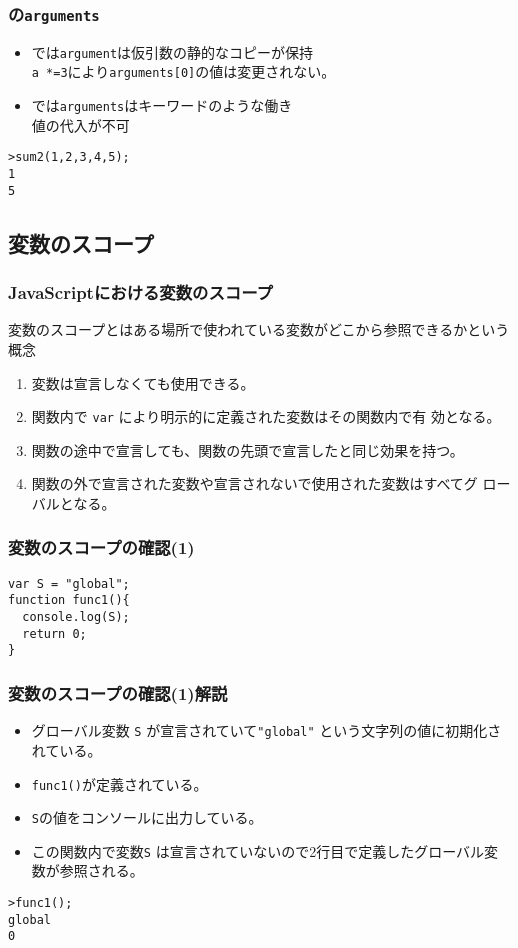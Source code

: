 \begin{frame}[containsverbatim]
\frametitle{\Strict の\Verb+arguments+}
\begin{itemize}
 \item \Strict では\Verb+argument+は仮引数の静的なコピーが保持\\
       \Verb+a *=3+により\Verb+arguments[0]+の値は変更されない。
 \item \Strict では\Verb+arguments+はキーワードのような働き\\
       値の代入が不可
\end{itemize} 

\begin{Verbatim}
>sum2(1,2,3,4,5);
1
5
\end{Verbatim}
\end{frame}
\subsection{変数のスコープ}
\begin{frame}[containsverbatim]
\frametitle{JavaScriptにおける変数のスコープ}
変数のスコープとはある場所で使われている変数がどこから参照できるかという
概念
\begin{enumerate}
 \item 変数は宣言しなくても使用できる。\label{3-4NoDeclare}
 \item 関数内で \Verb+var+ により明示的に定義された変数はその関数内で有
       効となる。\label{3-4DeclareInFunc}
 \item 関数の途中で宣言しても、関数の先頭で宣言したと同じ効果を持つ。
       \label{3-4DeclareInFunc2}
 \item 関数の外で宣言された変数や宣言されないで使用された変数はすべてグ
       ローバルとなる。\label{3-4Declare2}
\end{enumerate}
\end{frame}
\begin{frame}[containsverbatim]
\frametitle{変数のスコープの確認(1)}
\begin{Verbatim}
var S = "global";
function func1(){
  console.log(S);
  return 0;
}
\end{Verbatim}
\end{frame}
\begin{frame}[containsverbatim]
\frametitle{変数のスコープの確認(1)解説}
\begin{itemize}
 \item グローバル変数 \Verb+S+ が宣言されていて\Verb+"global"+
       という文字列の値に初期化されている。
 \item \Verb+func1()+が定義されている。
 \item \Verb+S+の値をコンソールに出力している。
 \item この関数内で変数\Verb+S+
       は宣言されていないので2行目で定義したグローバル変数が参照される。
\end{itemize}
\begin{Verbatim}
>func1();
global
0
\end{Verbatim}
\end{frame}
